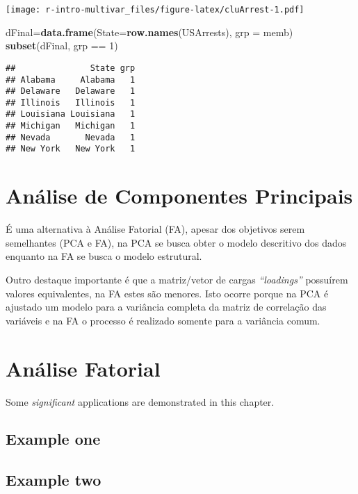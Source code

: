 \documentclass[]{book}
\newenvironment{Shaded}{\begin{snugshade}}{\end{snugshade}}
\newcommand{\KeywordTok}[1]{\textcolor[rgb]{0.13,0.29,0.53}{\textbf{{#1}}}}
\newcommand{\DataTypeTok}[1]{\textcolor[rgb]{0.13,0.29,0.53}{{#1}}}
\newcommand{\DecValTok}[1]{\textcolor[rgb]{0.00,0.00,0.81}{{#1}}}
\newcommand{\StringTok}[1]{\textcolor[rgb]{0.31,0.60,0.02}{{#1}}}
\newcommand{\NormalTok}[1]{{#1}}
\begin{document}
\texttt{[image: r-intro-multivar\_files/figure-latex/cluArrest-1.pdf]}

\begin{Shaded}
\begin{Highlighting}[]
\NormalTok{dFinal=}\KeywordTok{data.frame}\NormalTok{(}\DataTypeTok{State=}\KeywordTok{row.names}\NormalTok{(USArrests), }\DataTypeTok{grp =} \NormalTok{memb)}
\KeywordTok{subset}\NormalTok{(dFinal, grp ==}\StringTok{ }\DecValTok{1}\NormalTok{)}
\end{Highlighting}
\end{Shaded}

\begin{verbatim}
##               State grp
## Alabama     Alabama   1
## Delaware   Delaware   1
## Illinois   Illinois   1
## Louisiana Louisiana   1
## Michigan   Michigan   1
## Nevada       Nevada   1
## New York   New York   1
\end{verbatim}

\chapter{Análise de Componentes Principais}\label{PCA}

É uma alternativa à Análise Fatorial (FA), apesar dos objetivos serem
semelhantes (PCA e FA), na PCA se busca obter o modelo descritivo dos
dados enquanto na FA se busca o modelo estrutural.

Outro destaque importante é que a matriz/vetor de cargas
\emph{``loadings''} possuírem valores equivalentes, na FA estes são
menores. Isto ocorre porque na PCA é ajustado um modelo para a variância
completa da matriz de correlação das variáveis e na FA o processo é
realizado somente para a variância comum.

\chapter{Análise Fatorial}\label{FA}

Some \emph{significant} applications are demonstrated in this chapter.

\section{Example one}\label{example-one}

\section{Example two}\label{example-two}


\end{document}
